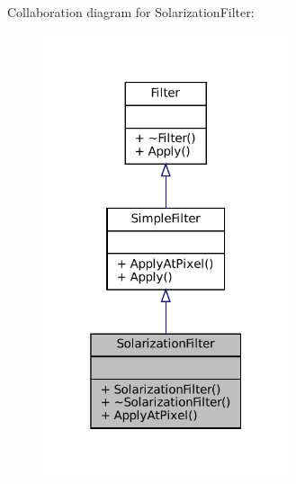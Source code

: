 Collaboration diagram for Solarization\+Filter\+:\nopagebreak
\begin{figure}[H]
\begin{center}
\leavevmode
\includegraphics[width=205pt]{classSolarizationFilter__coll__graph}
\end{center}
\end{figure}
